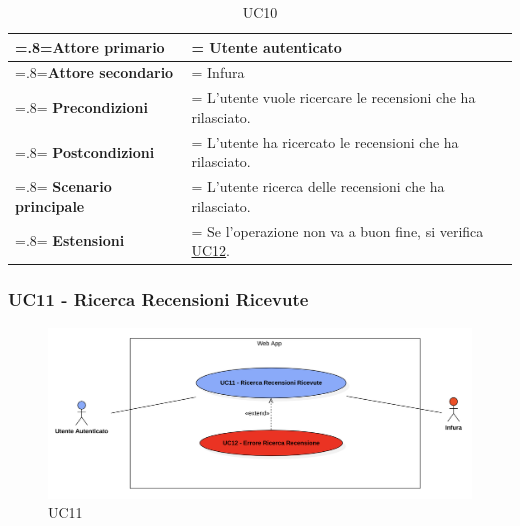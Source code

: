             \begin{table}[H]
                \centering
                \renewcommand{\arraystretch}{1.8}
                \renewcommand\tabularxcolumn[1]{m{#1}}
                \begin{tabularx}{0.9\textwidth} {
                    >{\hsize=.8\hsize\linewidth=\hsize}X
                    >{\hsize=1.2\hsize\linewidth=\hsize}X}
                    \hline
                    \textbf{Attore primario} & Utente autenticato \\
                    \hline
                    \textbf{Attore secondario} & Infura \\
                    \hline
                    \textbf{Precondizioni} & L'utente vuole ricercare le recensioni che ha rilasciato. \\
                    \hline
                    \textbf{Postcondizioni} & L'utente ha ricercato le recensioni che ha rilasciato. \\
                    \hline
                    \textbf{Scenario principale} & L'utente ricerca delle recensioni che ha rilasciato.\\
                    \hline
                    \textbf{Estensioni} & Se l'operazione non va a buon fine, si verifica \hyperref[UC12]{UC12}. \\
                    \hline
                \end{tabularx}
                \caption{UC10}
            \end{table}

        \subsubsection{UC11 - Ricerca Recensioni Ricevute}
        \label{UC11}

            \begin{figure}[H]
                \centering
                \includegraphics[scale=0.6]{src/img/UC11.png}
                \caption{UC11}
            \end{figure}

